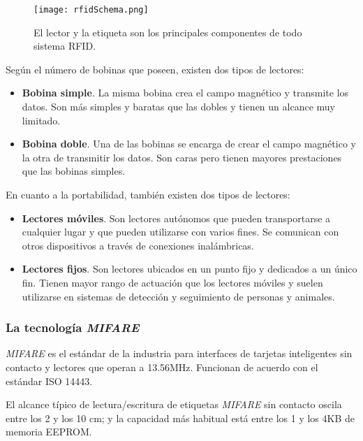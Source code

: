  \begin{figure}[!h]
    \begin{center}
      \texttt{[image: rfidSchema.png]}
      \caption{El lector y la etiqueta son los principales componentes de todo
sistema \acs{RFID}.}
      \label{fig:rfidSchema}
    \end{center}
  \end{figure}

  Según el número de bobinas que poseen, existen dos tipos de lectores:
  \begin{itemize}
  \item \textbf{Bobina simple}. La misma bobina crea el campo magnético y
  transmite los datos. Son más simples y baratas que las dobles y tienen
  un alcance muy limitado.
  \item \textbf{Bobina doble}. Una de las bobinas se encarga de crear el
  campo magnético y la otra de transmitir los datos. Son caras pero tienen
  mayores prestaciones que las bobinas simples.
  \end{itemize}
  
  En cuanto a la portabilidad, también existen dos tipos de lectores:
  \begin{itemize}
  \item \textbf{Lectores móviles}. Son lectores autónomos que pueden 
  transportarse a cualquier lugar y que pueden utilizarse con varios fines. Se
  comunican con otros dispositivos a través de conexiones inalámbricas.
  \item \textbf{Lectores fijos}. Son lectores ubicados en un punto fijo y 
  dedicados a un único fin. Tienen mayor rango de actuación que los lectores
  móviles y suelen utilizarse en sistemas de detección y seguimiento de
  personas y animales.
  \end{itemize}

    \subsubsection{La tecnología \emph{MIFARE}}
  \emph{MIFARE} es el estándar de la industria para interfaces de
  tarjetas inteligentes sin contacto y lectores que operan a 13.56MHz.
  Funcionan de acuerdo con el estándar \acs{ISO} 14443\cite{bib:mifare}.
  
  El alcance típico de lectura/escritura de etiquetas \emph{MIFARE} sin
  contacto oscila entre los 2 y los 10 cm; y la capacidad más habitual está
  entre los 1 y los 4KB de memoria \acs{EEPROM}.

